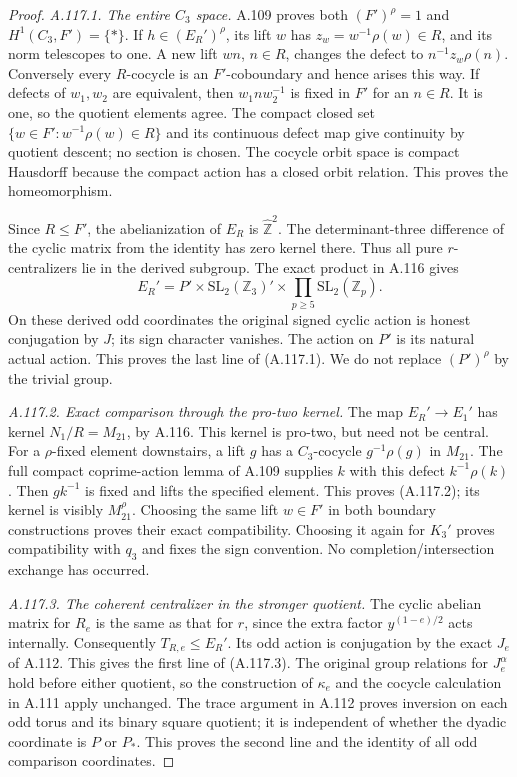 \begin{proof}
\emph{A.117.1. The entire \(C_3\) space.}
A.109 proves both \((F')^\rho=1\) and \(H^1(C_3,F')=\{*\}\).
If \(h\in(E_R')^\rho\), its lift \(w\) has
\(z_w=w^{-1}\rho(w)\in R\), and its norm telescopes to one.
A new lift \(wn\), \(n\in R\), changes the defect to
\(n^{-1}z_w\rho(n)\). Conversely every \(R\)-cocycle is an
\(F'\)-coboundary and hence arises this way.
If defects of \(w_1,w_2\) are equivalent, then
\(w_1nw_2^{-1}\) is fixed in \(F'\) for an \(n\in R\).
It is one, so the quotient elements agree.
The compact closed set
\(\{w\in F':w^{-1}\rho(w)\in R\}\) and its continuous defect
map give continuity by quotient descent; no section is chosen.
The cocycle orbit space is compact Hausdorff because the compact
action has a closed orbit relation. This proves the homeomorphism.

Since \(R\leq F'\), the abelianization of \(E_R\) is
\(\widehat{\mathbb Z}^2\). The determinant-three difference of
the cyclic matrix from the identity has zero kernel there.
Thus all pure \(r\)-centralizers lie in the derived subgroup.
The exact product in A.116 gives
\[
 E_R'=P'\times\mathrm{SL}_2(\mathbb Z_3)'
                   \times\prod_{p\geq5}\mathrm{SL}_2(\mathbb Z_p).
 \tag{A.117.7}
\]
On these derived odd coordinates the original signed cyclic
action is honest conjugation by \(J\); its sign character vanishes.
The action on \(P'\) is its natural actual action.
This proves the last line of (A.117.1).
We do not replace \((P')^\rho\) by the trivial group.

\emph{A.117.2. Exact comparison through the pro-two kernel.}
The map \(E_R'\to E_1'\) has kernel \(N_1/R=M_{21}\), by
A.116. This kernel is pro-two, but need not be central.
For a \(\rho\)-fixed element downstairs, a lift \(g\) has a
\(C_3\)-cocycle \(g^{-1}\rho(g)\) in \(M_{21}\).
The full compact coprime-action lemma of A.109 supplies \(k\)
with this defect \(k^{-1}\rho(k)\).
Then \(gk^{-1}\) is fixed and lifts the specified element.
This proves (A.117.2); its kernel is visibly \(M_{21}^\rho\).
Choosing the same lift \(w\in F'\) in both boundary constructions
proves their exact compatibility.
Choosing it again for \(K_3'\) proves compatibility with \(q_3\)
and fixes the sign convention. No completion/intersection exchange
has occurred.

\emph{A.117.3. The coherent centralizer in the stronger quotient.}
The cyclic abelian matrix for \(R_e\) is the same as that for
\(r\), since the extra factor \(y^{(1-e)/2}\) acts internally.
Consequently \(T_{R,e}\leq E_R'\).
Its odd action is conjugation by the exact \(J_e\) of A.112.
This gives the first line of (A.117.3).
The original group relations for \(J_e^\alpha\) hold before
either quotient, so the construction of \(\kappa_e\) and the
cocycle calculation in A.111 apply unchanged.
The trace argument in A.112 proves inversion on each odd torus
and its binary square quotient; it is independent of whether
the dyadic coordinate is \(P\) or \(P_*\).
This proves the second line and the identity of all odd
comparison coordinates.


\end{proof}
